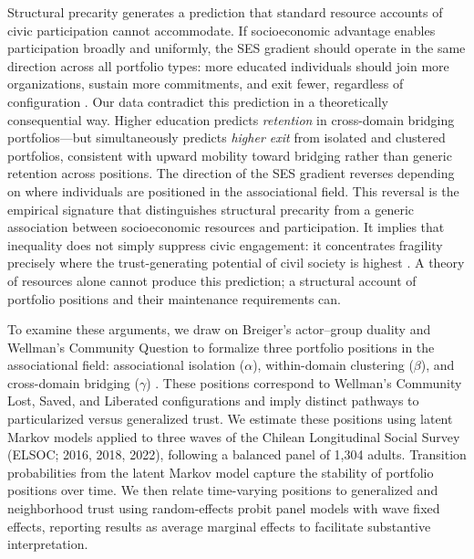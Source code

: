 Structural precarity generates a prediction that standard resource accounts
of civic participation cannot accommodate. If socioeconomic advantage enables participation broadly and uniformly, the SES gradient should operate in the same direction across all portfolio types: more educated individuals should join more organizations, sustain more commitments, and exit fewer, regardless of configuration \parencite{paxton_association_2007,
paxton_social_2002}. Our data contradict this prediction in a theoretically consequential way. Higher education predicts \textit{retention} in cross-domain bridging portfolios---but simultaneously predicts \textit{higher exit} from isolated and clustered portfolios, consistent with upward mobility toward bridging rather than generic retention across positions. The direction of the SES gradient reverses depending on where individuals are positioned in the associational field. This reversal is the empirical signature that distinguishes structural precarity from a generic association between socioeconomic resources and participation. It implies that inequality does not simply suppress civic engagement: it concentrates fragility precisely where the trust-generating potential of civil society is highest \parencite{stolle1998all, cook2005cooperation}. A theory of resources alone cannot produce this prediction; a structural account of portfolio positions and their maintenance requirements can.

To examine these arguments, we draw on Breiger's actor--group duality and Wellman's Community Question to formalize three portfolio positions in the associational field: associational isolation ($\alpha$), within-domain clustering ($\beta$), and cross-domain bridging ($\gamma$) \parencite{breiger_duality_1974, wellman_community_1979}. These positions correspond to Wellman's Community Lost, Saved, and Liberated configurations and imply distinct pathways to particularized versus generalized trust. We estimate these positions using latent Markov models applied to three waves of the Chilean Longitudinal Social Survey (ELSOC; 2016, 2018, 2022), following a balanced panel of 1{,}304 adults. Transition probabilities from the latent Markov model capture the stability of portfolio positions over time. We then relate time-varying positions to generalized and neighborhood trust using random-effects probit panel models with wave fixed effects, reporting results as average marginal effects to facilitate substantive interpretation.


